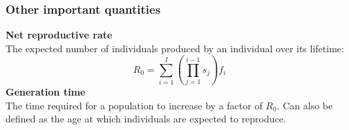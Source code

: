 \documentclass[color=usenames,dvipsnames]{beamer}\usepackage[]{graphicx}\usepackage[]{xcolor}
\begin{document}












\begin{frame}
  \frametitle{Other important quantities}
  {\bf Net reproductive rate \\}
  The expected number of individuals produced by an individual over
  its lifetime: \\
  \[
    R_0 = \sum_{i=1}^I \left(\prod_{j=1}^{i-1} s_j\right)f_i
  \]
  \pause
  \vfill
  {\bf Generation time \\}
  The time required for a population to increase by a factor of
  $R_0$. Can also be defined as the age at which individuals are
  expected to reproduce.  
\end{frame}





\end{document}

